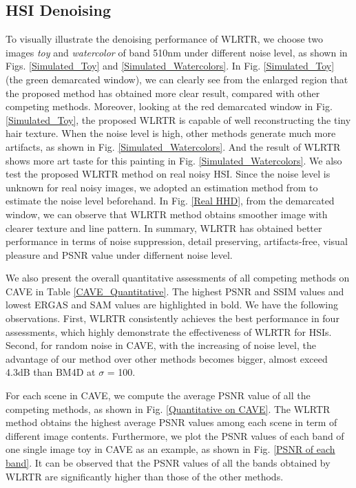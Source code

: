 \documentclass[twocolumn]{svjour3}          %
\begin{document}
  \subsection{HSI Denoising}
    To visually illustrate the denoising performance of WLRTR, we choose two images \emph{toy} and \emph{watercolor} of band 510nm under different noise level, as shown in Figs. \ref{Simulated_Toy} and \ref{Simulated_Watercolors}. In Fig. \ref{Simulated_Toy} (the green demarcated window), we can clearly see from the enlarged region that the proposed method has obtained more clear result, compared with other competing methods. Moreover, looking at the red demarcated window in Fig. \ref{Simulated_Toy}, the proposed WLRTR is capable of well reconstructing the tiny hair texture. When the noise level is high, other methods generate much more artifacts, as shown in Fig. \ref{Simulated_Watercolors}. And the result of WLRTR shows more art taste for this painting in Fig. \ref{Simulated_Watercolors}. We also test the proposed WLRTR method on real noisy HSI. Since the noise level is unknown for real noisy images, we adopted an estimation method from \cite{pyatykh2013image} to estimate the noise level beforehand. In Fig. \ref{Real HHD}, from the demarcated window, we can observe that WLRTR method obtains smoother image with clearer texture and line pattern. In summary, WLRTR has obtained better performance in terms of noise suppression, detail preserving, artifacts-free, visual pleasure and PSNR value under differnent noise level.

    We also present the overall quantitative assessments of all competing methods on CAVE in Table \ref{CAVE_Quantitative}. The highest PSNR and SSIM values and lowest ERGAS and SAM values are highlighted in bold. We have the following observations. First, WLRTR consistently achieves the best performance in four assessments, which highly demonstrate the effectiveness of WLRTR for HSIs. Second, for random noise in CAVE, with the increasing of noise level, the advantage of our method over other methods becomes bigger, almost exceed 4.3dB than BM4D at $\sigma$ = 100.

    For each scene in CAVE, we compute the average PSNR value of all the competing methods, as shown in Fig. \ref{Quantitative on CAVE}. The WLRTR method obtains the highest average PSNR values among each scene in term of different image contents. Furthermore, we plot the PSNR values of each band of one single image toy in CAVE as an example, as shown in Fig. \ref{PSNR of each band}. It can be observed that the PSNR values of all the bands obtained by WLRTR are significantly higher than those of the other methods.
\end{document}
